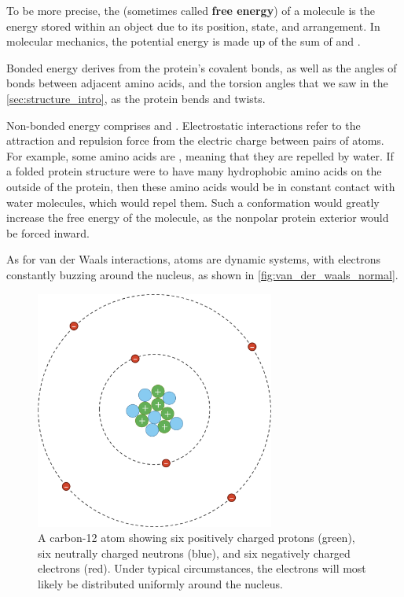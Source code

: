 To be more precise, the  (sometimes called \textbf{free energy}) of a molecule is the energy stored within an object due to its position, state, and arrangement. In molecular mechanics, the potential energy is made up of the sum of  and .

Bonded energy derives from the protein's covalent bonds, as well as the angles of bonds between adjacent amino acids, and the torsion angles that we saw in the \autoref{sec:structure_intro}, as the protein bends and twists.

Non-bonded energy comprises  and . Electrostatic interactions refer to the attraction and repulsion force from the electric charge between pairs of atoms. For example, some amino acids are , meaning that they are repelled by water. If a folded protein structure were to have many hydrophobic amino acids on the outside of the protein, then these amino acids would be in constant contact with water molecules, which would repel them. Such a conformation would greatly increase the free energy of the molecule, as the nonpolar protein exterior would be forced inward.

As for van der Waals interactions, atoms are dynamic systems, with electrons constantly buzzing around the nucleus, as shown in \autoref{fig:van_der_waals_normal}.

\begin{figure}[h]
	\centering
	\mySfFamily
	\includegraphics[width = 0.7\textwidth]{../images/van_der_waals_normal.png}
	\caption{A carbon-12 atom showing six positively charged protons (green), six neutrally charged neutrons (blue), and six negatively charged electrons (red). Under typical circumstances, the electrons will most likely be distributed uniformly around the nucleus.}
	\label{fig:van_der_waals_normal}
\end{figure}

